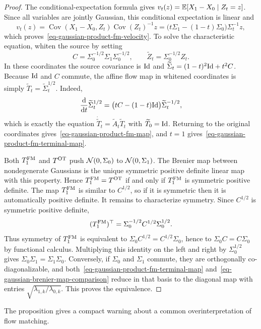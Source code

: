 \begin{proof}
	The conditional-expectation formula gives
	\(v_t(z)=\mathbb{E}[X_1-X_0\mid Z_t=z]\).
	Since all variables are jointly Gaussian, this conditional expectation is linear and
	\[
		v_t(z)
		=
		\operatorname{Cov}(X_1-X_0,Z_t)\operatorname{Cov}(Z_t)^{-1}z
		=
		\bigl(t\Sigma_1-(1-t)\Sigma_0\bigr)\Sigma_t^{-1}z,
	\]
	which proves~\eqref{eq-gaussian-product-fm-velocity}. To solve the characteristic equation, whiten the source by setting
	\[
		C=\Sigma_0^{-1/2}\Sigma_1\Sigma_0^{-1/2},
		\qquad
		\widetilde Z_t=\Sigma_0^{-1/2}Z_t.
	\]
	In these coordinates the source covariance is $\mathrm{Id}$ and
	\(\widetilde\Sigma_t=(1-t)^2\mathrm{Id}+t^2C\).
	Because $\mathrm{Id}$ and $C$ commute, the affine flow map in whitened coordinates is simply $\widetilde T_t=\widetilde\Sigma_t^{1/2}$. Indeed,
	\[
		\frac{\mathrm{d}}{\mathrm{d} t}\widetilde\Sigma_t^{1/2}
		=
		\bigl(tC-(1-t)\mathrm{Id}\bigr)\widetilde\Sigma_t^{-1/2},
	\]
	which is exactly the equation $\dot{\widetilde T}_t=\widetilde A_t\widetilde T_t$ with $\widetilde T_0=\mathrm{Id}$. Returning to the original coordinates gives~\eqref{eq-gaussian-product-fm-map}, and $t=1$ gives~\eqref{eq-gaussian-product-fm-terminal-map}.

	Both $T_1^{\rm FM}$ and $T^{\rm OT}$ push $\mathcal{N}(0,\Sigma_0)$ to $\mathcal{N}(0,\Sigma_1)$. The Brenier map between nondegenerate Gaussians is the unique symmetric positive definite linear map with this property. Hence $T_1^{\rm FM}=T^{\rm OT}$ if and only if $T_1^{\rm FM}$ is symmetric positive definite. The map $T_1^{\rm FM}$ is similar to $C^{1/2}$, so if it is symmetric then it is automatically positive definite. It remains to characterize symmetry. Since $C^{1/2}$ is symmetric positive definite,
	\[
		(T_1^{\rm FM})^\top
		=
		\Sigma_0^{-1/2}C^{1/2}\Sigma_0^{1/2}.
	\]
	Thus symmetry of $T_1^{\rm FM}$ is equivalent to
	$\Sigma_0 C^{1/2}=C^{1/2}\Sigma_0$, hence to $\Sigma_0 C=C\Sigma_0$ by functional calculus. Multiplying this identity on the left and right by $\Sigma_0^{1/2}$ gives $\Sigma_0\Sigma_1=\Sigma_1\Sigma_0$. Conversely, if $\Sigma_0$ and $\Sigma_1$ commute, they are orthogonally co-diagonalizable, and both~\eqref{eq-gaussian-product-fm-terminal-map} and~\eqref{eq-gaussian-brenier-map-comparison} reduce in that basis to the diagonal map with entries $\sqrt{\lambda_{1,k}/\lambda_{0,k}}$. This proves the equivalence.
\end{proof}

The proposition gives a compact warning about a common overinterpretation of flow matching.

